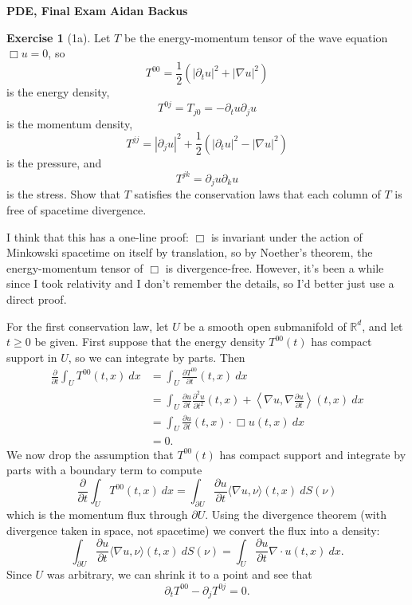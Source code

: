 \documentclass[10pt]{article}
\newcommand{\RR}{\mathbb{R}}
\theoremstyle{definition}
\newtheorem{exer}{Exercise}
\begin{document}
\noindent
\large\textbf{PDE, Final Exam} \hfill \textbf{Aidan Backus} \\


\begin{exer}[1a]
Let $T$ be the energy-momentum tensor of the wave equation $\Box u = 0$, so
$$T^{00} = \frac{1}{2}(|\partial_tu|^2 + |\nabla u|^2)$$
is the energy density,
$$T^{0j} = T_{j0} = -\partial_tu\partial_ju$$
is the momentum density,
$$T^{jj} = |\partial_ju|^2 + \frac{1}{2}(|\partial_tu|^2 - |\nabla u|^2)$$
is the pressure, and
$$T^{jk} = \partial_ju\partial_ku$$
is the stress. Show that $T$ satisfies the conservation laws that each column of $T$ is free of spacetime divergence.
\end{exer}

I think that this has a one-line proof: $\Box$ is invariant under the action of Minkowski spacetime on itself by translation, so by Noether's theorem, the energy-momentum tensor of $\Box$ is divergence-free. However, it's been a while since I took relativity and I don't remember the details, so I'd better just use a direct proof.

For the first conservation law, let $U$ be a smooth open submanifold of $\RR^d$, and let $t \geq 0$ be given.
First suppose that the energy density $T^{00}(t)$ has compact support in $U$, so we can integrate by parts. Then
\begin{align*}
\frac{\partial}{\partial t} \int_U T^{00}(t, x) ~dx &= \int_U \frac{\partial T^{00}}{\partial t}(t, x)~dx\\
&= \int_U \frac{\partial u}{\partial t} \frac{\partial^2 u}{\partial t^2}(t, x) + \left\langle \nabla u, \nabla \frac{\partial u}{\partial t}\right\rangle(t, x) ~dx\\
&= \int_U \frac{\partial u}{\partial t}(t, x) \cdot \Box u(t, x) ~dx\\
&= 0.
\end{align*}
We now drop the assumption that $T^{00}(t)$ has compact support and integrate by parts with a boundary term to compute
$$
\frac{\partial}{\partial t} \int_U T^{00}(t, x) ~dx = \int_{\partial U} \frac{\partial u}{\partial t} \langle \nabla u, \nu\rangle(t, x) ~dS(\nu)
$$
which is the momentum flux through $\partial U$.
Using the divergence theorem (with divergence taken in space, not spacetime) we convert the flux into a density:
$$\int_{\partial U} \frac{\partial u}{\partial t} \langle \nabla u, \nu\rangle(t, x) ~dS(\nu)
= \int_U \frac{\partial u}{\partial t} \nabla \cdot u(t, x) ~dx.
$$
Since $U$ was arbitrary, we can shrink it to a point and see that
$$\partial_t T^{00} - \partial_j T^{0j} = 0.$$
\end{document}
